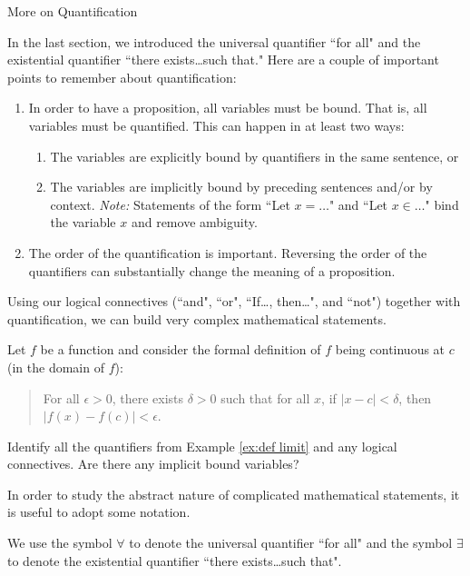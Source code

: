 \begin{section}{More on Quantification}

In the last section, we introduced the universal quantifier ``for all" and the existential quantifier ``there exists\ldots such that."  Here are a couple of important points to remember about quantification:
\begin{enumerate}
\item In order to have a proposition, all variables must be bound.  That is, all variables must be quantified.  This can happen in at least two ways:
\begin{enumerate}
\item The variables are explicitly bound by quantifiers in the same sentence, or
\item The variables are implicitly bound by preceding sentences and/or by context.  \emph{Note:}  Statements of the form ``Let $x=\ldots$" and ``Let $x\in\ldots$" bind the variable $x$ and remove ambiguity.
\end{enumerate}
\item The order of the quantification is important.  Reversing the order of the quantifiers can substantially change the meaning of a proposition.
\end{enumerate}

Using our logical connectives (``and", ``or", ``If\ldots, then\ldots", and ``not") together with quantification, we can build very complex mathematical statements.

\begin{example}\label{ex:def limit}
Let $f$ be a function and consider the formal definition of $f$ being continuous at $c$ (in the domain of $f$):

\begin{quote}
For all $\epsilon >0$, there exists $\delta >0$ such that for all $x$, if $|x-c|<\delta$, then $|f(x)-f(c)|<\epsilon$.
\end{quote}
\end{example}

\begin{exercise}
Identify all the quantifiers from Example \ref{ex:def limit} and any logical connectives.  Are there any implicit bound variables?
\end{exercise}

In order to study the abstract nature of complicated mathematical statements, it is useful to adopt some notation.

\begin{definition}
We use the symbol $\forall$ to denote the universal quantifier ``for all" and the symbol $\exists$ to denote the existential quantifier ``there exists\ldots such that".
\end{definition}


\end{section}
